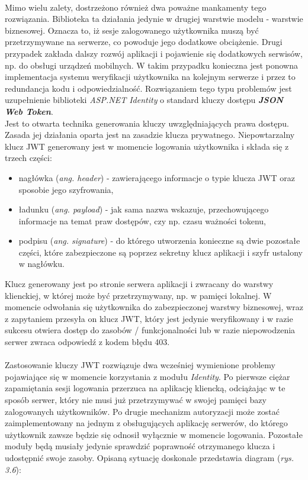     \\
    Mimo wielu zalety, dostrzeżono również dwa poważne mankamenty tego rozwiązania. Biblioteka ta działania jedynie w drugiej warstwie modelu - warstwie biznesowej. Oznacza to, iż sesje zalogowanego użytkownika muszą być przetrzymywane na serwerze, co powoduje jego dodatkowe obciążenie. Drugi przypadek zakłada dalszy rozwój aplikacji i pojawienie się dodatkowych serwisów, np. do obsługi urządzeń mobilnych. W takim przypadku konieczna jest ponowna implementacja systemu weryfikacji użytkownika na kolejnym serwerze i przez to redundancja kodu i odpowiedzialność. Rozwiązaniem tego typu problemów jest uzupełnienie biblioteki \textit{ASP.NET Identity} o standard kluczy dostępu \textbf{\textit{JSON Web Token}}.\\
    Jest to otwarta technika generowania kluczy uwzględniających prawa dostępu. Zasada jej działania oparta jest na zasadzie klucza prywatnego. Niepowtarzalny klucz JWT generowany jest w momencie logowania użytkownika i składa się z trzech części:
    \begin{itemize}
        \item nagłówka (\textit{ang. header}) - zawierającego informacje o typie klucza JWT oraz sposobie jego szyfrowania,
        \item ładunku (\textit{ang. payload}) - jak sama nazwa wskazuje, przechowującego informacje na temat praw dostępów, czy np. czasu ważności tokenu,
        \item podpisu (\textit{ang. signature}) - do którego utworzenia konieczne są dwie pozostałe części, które zabezpieczone są poprzez sekretny klucz aplikacji i szyfr ustalony w nagłówku.
    \end{itemize}
    Klucz generowany jest po stronie serwera aplikacji i zwracany do warstwy klienckiej, w której może być przetrzymywany, np. w pamięci lokalnej. W momencie odwołania się użytkownika do zabezpieczonej warstwy biznesowej, wraz z zapytaniem przesyła on klucz JWT, który jest jedynie weryfikowany i w razie sukcesu otwiera dostęp do zasobów / funkcjonalności lub w razie niepowodzenia serwer zwraca odpowiedź z kodem błędu 403.\\
\\
Zastosowanie kluczy JWT rozwiązuje dwa wcześniej wymienione problemy pojawiające się w momencie korzystania z modułu \textit{Identity}. Po pierwsze ciężar zapamiętania sesji logowania przerzuca na aplikację kliencką, odciążając w te sposób serwer, który nie musi już przetrzymywać w swojej pamięci bazy zalogowanych użytkowników. Po drugie mechanizm autoryzacji może zostać zaimplementowany na jednym z obsługujących aplikację serwerów, do którego użytkownik zawsze będzie się odnosił wyłącznie w momencie logowania. Pozostałe moduły będą musiały jedynie sprawdzić poprawność otrzymanego klucza i udostępnić swoje zasoby. Opisaną sytuację doskonale przedstawia diagram (\textit{rys. 3.6}):
    
